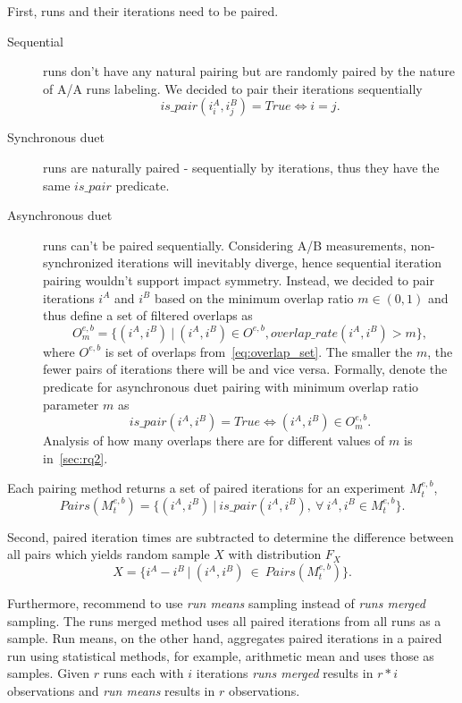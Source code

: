 First, runs and their iterations need to be paired.
\begin{description}
    \item[Sequential] runs don't have any natural pairing but are randomly paired by the nature of A/A runs labeling. We decided to pair their iterations sequentially
        $$
        is\_pair(i^A_i, i^B_j) = True \Longleftrightarrow i = j.
        $$
    \item[Synchronous duet] runs are naturally paired - sequentially by iterations, thus they have the same $is\_pair$ predicate.
    \item[Asynchronous duet] runs can't be paired sequentially.
        Considering A/B measurements, non-synchronized iterations will inevitably diverge, hence sequential iteration pairing wouldn't support impact symmetry.
        Instead, we decided to pair iterations $i^A$ and $i^B$ based on the minimum overlap ratio $m \in (0, 1)$ and thus define a set of filtered overlaps as
        \begin{equation}\label{eq:overlap_set_filtered}
        O^{e,b}_m = \{(i^A, i^B)~|~(i^A, i^B) \in O^{e, b}, overlap\_rate(i^A, i^B) > m\},
        \end{equation}
        where $O^{e, b}$ is set of overlaps from~\cref{eq:overlap_set}.
        The smaller the $m$, the fewer pairs of iterations there will be and vice versa.
        Formally, denote the predicate for asynchronous duet pairing with minimum overlap ratio parameter $m$ as
        $$
        is\_pair(i^A, i^B) = True \Longleftrightarrow (i^A, i^B) \in O^{e,b}_m.
        $$
        Analysis of how many overlaps there are for different values of $m$ is in~\cref{sec:rq2}.
\end{description}
Each pairing method returns a set of paired iterations for an experiment $M^{e, b}_t$,
$$
Pairs(M^{e, b}_t) = \{(i^A, i^B)~|~is\_pair(i^A, i^B),~\forall~i^A, i^B \in M^{e, b}_t\}.
$$

Second, paired iteration times are subtracted to determine the difference between all pairs which yields random sample $X$ with distribution $F_X$
$$
X = \{i^A - i^B~|~(i^A, i^B)~\in~Pairs(M^{e, b}_t)\}.
$$

Furthermore, \citet{bulej2017stat} recommend to use \emph{run means} sampling instead of \emph{runs merged} sampling.
The runs merged method uses all paired iterations from all runs as a sample.
Run means, on the other hand, aggregates paired iterations in a paired run using statistical methods, for example, arithmetic mean and uses those as samples.
Given $r$ runs each with $i$ iterations \emph{runs merged} results in $r * i$ observations and \emph{run means} results in $r$ observations.

